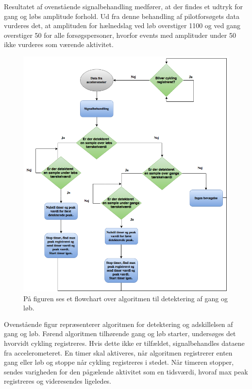 Resultatet af ovenstående signalbehandling medfører, at der findes et udtryk for gang og løbs amplitude forhold. Ud fra denne behandling af pilotforsøgets data vurderes det, at amplituden for hælnedslag ved løb overstiger 1100 og ved gang overstiger 50 for alle forsøgspersoner, hvorfor events med amplituder under 50 ikke vurderes som værende aktivitet.
\begin{figure}[H]
	\centering
	\includegraphics[scale=0.5]{figures/cDesign/algoritme_gl.png}
	\caption{På figuren ses et flowchart over algoritmen til detektering af gang og løb.}
	\label{fig:algoritme}
\end{figure}
Ovenstående figur repræsenterer algoritmen for detektering og adskillelsen af gang og løb. Førend algoritmen tilhørende gang og løb starter, undersøges det hvorvidt cykling registreres. Hvis dette ikke er tilfældet, signalbehandles dataene fra accelerometeret. En timer skal aktiveres, når algoritmen registrerer enten gang eller løb og stoppe når cykling registreres i stedet. Når timeren stopper, sendes varigheden for den pågælende aktivitet som en tidsværdi, hvoraf max peak registreres og videresendes ligeledes. %
